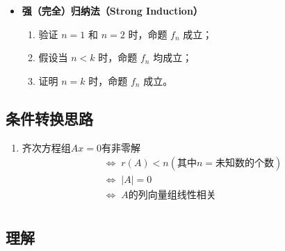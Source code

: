 \documentclass[a4paper,12pt]{article}
\begin{document}
\begin{enumerate}
\begin{itemize}
            \item \textbf{强（完全）归纳法（Strong Induction）}
            \begin{enumerate}
                \item 验证 $n = 1$ 和 $n = 2$ 时，命题 $f_n$ 成立；
                \item 假设当 $n < k$ 时，命题 $f_n$ 均成立；
                \item 证明 $n = k$ 时，命题 $f_n$ 成立。
            \end{enumerate}
        \end{itemize}
    \end{enumerate}

    \subsection{条件转换思路}

    \begin{enumerate}
        \item 齐次方程组$Ax = 0$有非零解
        \begin{align*}
            &\Leftrightarrow\; r(A) < n (\text{其中}n = \text{未知数的个数})  \\
            &\Leftrightarrow\; |A| = 0  \\
            &\Leftrightarrow\; A \text{的列向量组线性相关}  \\
        \end{align*}
    \end{enumerate}

    \subsection{理解}

    \begin{enumerate}
    \end{enumerate}
\end{document}
